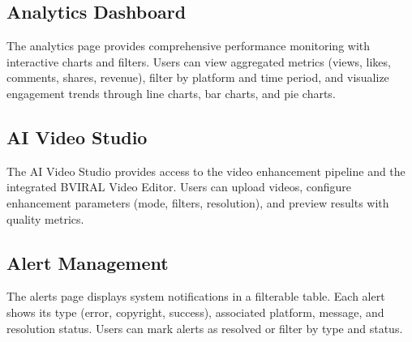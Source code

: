 
\subsection{Analytics Dashboard}

The analytics page provides comprehensive performance monitoring with interactive charts and filters. Users can view aggregated metrics (views, likes, comments, shares, revenue), filter by platform and time period, and visualize engagement trends through line charts, bar charts, and pie charts.


\subsection{AI Video Studio}

The AI Video Studio provides access to the video enhancement pipeline and the integrated BVIRAL Video Editor. Users can upload videos, configure enhancement parameters (mode, filters, resolution), and preview results with quality metrics.


\subsection{Alert Management}

The alerts page displays system notifications in a filterable table. Each alert shows its type (error, copyright, success), associated platform, message, and resolution status. Users can mark alerts as resolved or filter by type and status.


